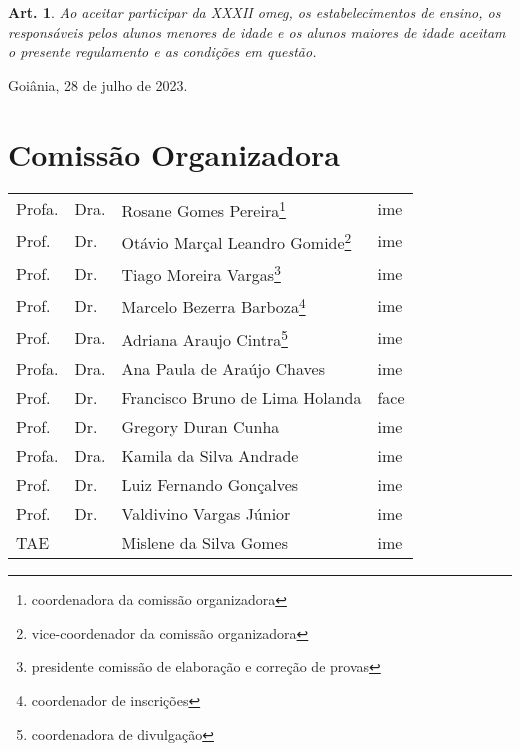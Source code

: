 \documentclass[a4paper,12pt]{article}
\newtheorem{article}{Art.}
\def\currentEdition{XXXII}
\def\year{2023}
\begin{document}
\begin{article}
  Ao aceitar participar da \currentEdition{} \acrshort{omeg}, os
  estabelecimentos de ensino, os responsáveis pelos alunos menores de idade e
  os alunos maiores de idade aceitam o presente regulamento e as condições em
  questão.
\end{article}

Goiânia, 28 de julho de \year.

\section*{Comissão Organizadora}

\begin{table}[H]
  \centering
  \begin{tabular}{llll}
    Profa. & Dra. & Rosane Gomes Pereira\footnote{coordenadora da comissão organizadora}                  & \acrshort{ime}  \\
    Prof.  & Dr.  & Otávio Marçal Leandro Gomide\footnote{vice-coordenador da comissão organizadora}      & \acrshort{ime}  \\
    Prof.  & Dr.  & Tiago Moreira Vargas\footnote{presidente comissão de elaboração e correção de provas} & \acrshort{ime}  \\
    Prof.  & Dr.  & Marcelo Bezerra Barboza\footnote{coordenador de inscrições}                           & \acrshort{ime}  \\
    Prof.  & Dra. & Adriana Araujo Cintra\footnote{coordenadora de divulgação}                            & \acrshort{ime}  \\
    Profa. & Dra. & Ana Paula de Araújo Chaves                                                            & \acrshort{ime}  \\
    Prof.  & Dr.  & Francisco Bruno de Lima Holanda                                                       & \acrshort{face} \\
    Prof.  & Dr.  & Gregory Duran Cunha                                                                   & \acrshort{ime}  \\
    Profa. & Dra. & Kamila da Silva Andrade                                                               & \acrshort{ime}  \\
    Prof.  & Dr.  & Luiz Fernando Gonçalves                                                               & \acrshort{ime}  \\
    Prof.  & Dr.  & Valdivino Vargas Júnior                                                               & \acrshort{ime}  \\
    TAE    &      & Mislene da Silva Gomes                                                                & \acrshort{ime}
  \end{tabular}
\end{table}
\end{document}
